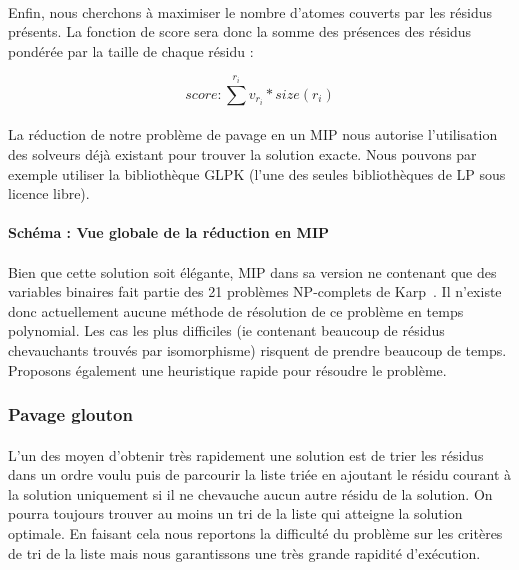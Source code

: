 \documentclass[12pt,french,twoside]{report}
\begin{document}
\paragraph{}Enfin, nous cherchons à maximiser le nombre d'atomes couverts par les résidus présents. La fonction de score sera
donc la somme des présences des résidus pondérée par la taille de chaque résidu :

\begin{equation}
 score : \sum^{r_i} v_{r_i} * size(r_i)
\end{equation}

\paragraph{}La réduction de notre problème de pavage en un MIP nous autorise l'utilisation des solveurs déjà existant pour trouver la solution exacte.
Nous pouvons par exemple utiliser la bibliothèque GLPK (l'une des seules bibliothèques de LP sous licence libre).

\paragraph{Schéma : Vue globale de la réduction en MIP}

\paragraph{}Bien que cette solution soit élégante, MIP dans sa version ne contenant que des variables binaires fait partie des 21 problèmes NP-complets de Karp~\cite{karp_reducibility_1972}.
Il n'existe donc actuellement aucune méthode de résolution de ce problème en temps polynomial.
Les cas les plus difficiles (ie contenant beaucoup de résidus chevauchants trouvés par isomorphisme) risquent de prendre beaucoup de temps.
Proposons également une heuristique rapide pour résoudre le problème.



\subsubsection{Pavage glouton}

\label{TM_p}

\paragraph{}L'un des moyen d'obtenir très rapidement une solution est de trier les résidus dans un ordre voulu puis de parcourir la liste triée en ajoutant le résidu courant à la solution uniquement si il ne chevauche aucun autre résidu de la solution.
On pourra toujours trouver au moins un tri de la liste qui atteigne la solution optimale.
En faisant cela nous reportons la difficulté du problème sur les critères de tri de la liste mais nous garantissons une très grande rapidité d'exécution.
\end{document}
